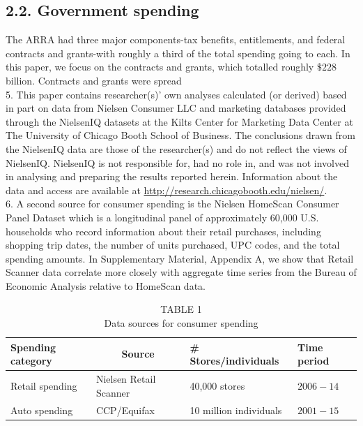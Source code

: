 \documentclass[10pt]{article}
\begin{document}
\subsection*{2.2. Government spending}
The ARRA had three major components-tax benefits, entitlements, and federal contracts and grants-with roughly a third of the total spending going to each. In this paper, we focus on the contracts and grants, which totalled roughly $\$ 228$ billion. Contracts and grants were spread\\
5. This paper contains researcher(s)' own analyses calculated (or derived) based in part on data from Nielsen Consumer LLC and marketing databases provided through the NielsenIQ datasets at the Kilts Center for Marketing Data Center at The University of Chicago Booth School of Business. The conclusions drawn from the NielsenIQ data are those of the researcher(s) and do not reflect the views of NielsenIQ. NielsenIQ is not responsible for, had no role in, and was not involved in analysing and preparing the results reported herein. Information about the data and access are available at \href{http://research.chicagobooth.edu/nielsen/}{http://research.chicagobooth.edu/nielsen/}.\\
6. A second source for consumer spending is the Nielsen HomeScan Consumer Panel Dataset which is a longitudinal panel of approximately 60,000 U.S. households who record information about their retail purchases, including shopping trip dates, the number of units purchased, UPC codes, and the total spending amounts. In Supplementary Material, Appendix A, we show that Retail Scanner data correlate more closely with aggregate time series from the Bureau of Economic Analysis relative to HomeScan data.

\begin{table}[h]
\begin{center}
\captionsetup{labelformat=empty}
\caption{TABLE 1\\
Data sources for consumer spending}
\begin{tabular}{llll}
\hline
Spending category & \multicolumn{1}{c}{Source} & \# Stores/individuals & Time period \\
\hline
Retail spending & Nielsen Retail Scanner & 40,000 stores & $2006-14$ \\
Auto spending & CCP/Equifax & 10 million individuals & $2001-15$ \\
\hline
\end{tabular}
\end{center}
\end{table}
\end{document}
